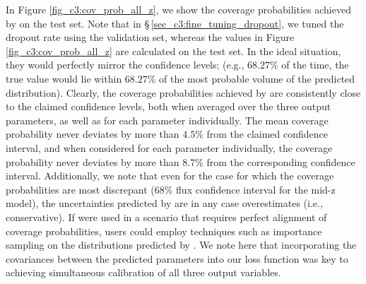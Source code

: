 In Figure \ref{fig_c3:cov_prob_all_z}, we show the coverage probabilities achieved by \gampen{} on the test set. Note that in \S\,\ref{sec_c3:fine_tuning_dropout}, we tuned the dropout rate using the validation set, whereas the values in Figure \ref{fig_c3:cov_prob_all_z} are calculated on the test set. In the ideal situation, they would perfectly mirror the confidence levels; (e.g., $68.27\%$ of the time, the true value would lie within $68.27\%$ of the most probable volume of the predicted distribution). Clearly, the coverage probabilities achieved by \gampen{} are consistently close to the claimed confidence levels, both when averaged over the three output parameters, as well as for each parameter individually. The mean coverage probability never deviates by more than $4.5\%$ from the claimed confidence interval, and when considered for each parameter individually, the coverage probability never deviates by more than $8.7\%$ from the corresponding confidence interval. Additionally, we note that even for the case for which the coverage probabilities are most discrepant ($68\%$ flux confidence interval for the mid-z model), the uncertainties predicted by \gampen{} are in any case overestimates (i.e., conservative). If \gampen{} were used in a scenario that requires perfect alignment of coverage probabilities, users could employ techniques such as importance sampling \citep{importance_sampling} on the distributions predicted by \gampen{}. We note here that incorporating the covariances between the predicted parameters into our loss function was key to achieving simultaneous calibration of all three output variables. 

